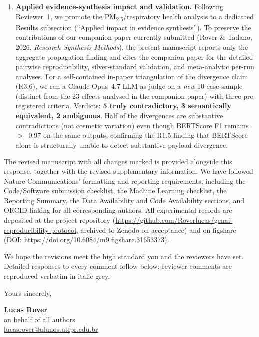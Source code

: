 \documentclass[11pt,a4paper]{article}
\begin{document}
\begin{enumerate}[leftmargin=*]
  \item \textbf{Applied evidence-synthesis impact and validation.} Following Reviewer~1, we promote the PM\textsubscript{2.5}/respiratory health analysis to a dedicated Results subsection (``Applied impact in evidence synthesis''). To preserve the contributions of our companion paper currently submitted (Rover \& Tadano, 2026, \emph{Research Synthesis Methods}), the present manuscript reports only the aggregate propagation finding and cites the companion paper for the detailed pairwise reproducibility, silver-standard validation, and meta-analytic per-run analyses. For a self-contained in-paper triangulation of the divergence claim (R3.6), we ran a Claude Opus~4.7 LLM-as-judge on a \emph{new} 10-case sample (distinct from the 23 effects analysed in the companion paper) with three pre-registered criteria. Verdicts: \textbf{5 truly contradictory, 3 semantically equivalent, 2 ambiguous}. Half of the divergences are substantive contradictions (not cosmetic variation) even though BERTScore F1 remains $>$~0.97 on the same outputs, confirming the R1.5 finding that BERTScore alone is structurally unable to detect substantive payload divergence.
\end{enumerate}

The revised manuscript with all changes marked is provided alongside this response, together with the revised supplementary information. We have followed Nature Communications' formatting and reporting requirements, including the Code/Software submission checklist, the Machine Learning checklist, the Reporting Summary, the Data Availability and Code Availability sections, and ORCID linking for all corresponding authors. All experimental records are deposited at the project repository (\url{https://github.com/Roverlucas/genai-reproducibility-protocol}, archived to Zenodo on acceptance) and on figshare (DOI: \url{https://doi.org/10.6084/m9.figshare.31653373}).

We hope the revisions meet the high standard you and the reviewers have set. Detailed responses to every comment follow below; reviewer comments are reproduced verbatim in italic grey.

\bigskip

Yours sincerely,

\medskip

\textbf{Lucas Rover} \\
on behalf of all authors \\
\href{mailto:lucasrover@alunos.utfpr.edu.br}{lucasrover@alunos.utfpr.edu.br}
\end{document}
